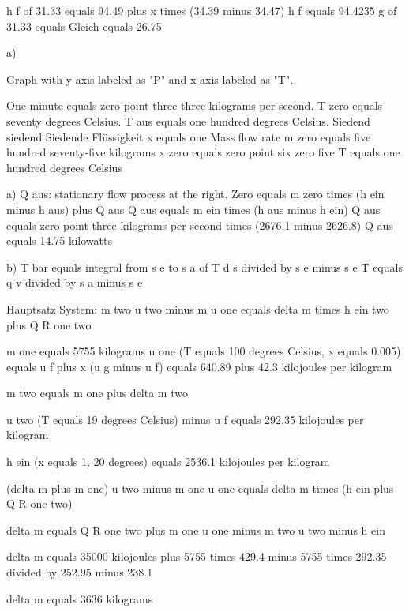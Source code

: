 h f of 31.33 equals 94.49 plus x times (34.39 minus 34.47)  
h f equals 94.4235  
g of 31.33 equals Gleich equals 26.75  

a)

Graph with y-axis labeled as "P" and x-axis labeled as "T".

One minute equals zero point three three kilograms per second.  
T zero equals seventy degrees Celsius.  
T aus equals one hundred degrees Celsius.  
Siedend siedend  
Siedende Flüssigkeit x equals one  
Mass flow rate m zero equals five hundred seventy-five kilograms  
x zero equals zero point six zero five  
T equals one hundred degrees Celsius  

a) Q aus: stationary flow process at the right.  
Zero equals m zero times (h ein minus h aus) plus Q aus  
Q aus equals m ein times (h aus minus h ein)  
Q aus equals zero point three kilograms per second times (2676.1 minus 2626.8)  
Q aus equals 14.75 kilowatts  

b) T bar equals integral from s e to s a of T d s divided by s e minus s e  
T equals q v divided by s a minus s e

Hauptsatz System:  
m two u two minus m u one equals delta m times h ein two plus Q R one two  

m one equals 5755 kilograms  
u one (T equals 100 degrees Celsius, x equals 0.005) equals u f plus x (u g minus u f) equals 640.89 plus 42.3 kilojoules per kilogram  

m two equals m one plus delta m two  

u two (T equals 19 degrees Celsius) minus u f equals 292.35 kilojoules per kilogram  

h ein (x equals 1, 20 degrees) equals 2536.1 kilojoules per kilogram  

(delta m plus m one) u two minus m one u one equals delta m times (h ein plus Q R one two)  

delta m equals Q R one two plus m one u one minus m two u two minus h ein  

delta m equals 35000 kilojoules plus 5755 times 429.4 minus 5755 times 292.35 divided by 252.95 minus 238.1  

delta m equals 3636 kilograms